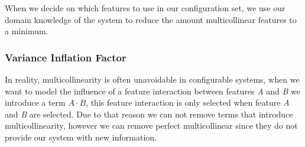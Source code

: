 When we decide on which features to use in our configuration set, we use our domain knowledge of the system to reduce the amount multicollinear
features to a minimum.

%
%
%




\subsubsection{Variance Inflation Factor}\label{ch:vif}
In reality, multicollinearity is often unavoidable in configurable systems, when we want to model the influence of a feature interaction between features
\textit{A} and \textit{B} we introduce a term $A \cdot B$, this feature interaction is only selected when feature \textit{A} and \textit{B} are selected. 
Due to that reason we can not remove terms that introduce multicollinearity, however we can remove perfect multicollinear since they do not provide our 
system with new information.

